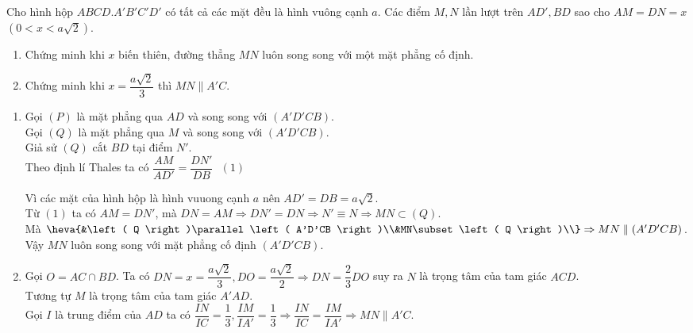 \begin{bt}%
	Cho hình hộp $ABCD.A'B'C'D'$ có tất cả các mặt đều là hình vuông cạnh $a$. Các điểm $M,N$ lần lượt trên $AD',BD$ sao cho $AM=DN=x$ $\left( 0<x<a\sqrt{2} \right)$.
	\begin{enumerate}
		\item Chứng minh khi $x$ biến thiên, đường thẳng $MN$ luôn song song với một mặt phẳng cố định.
		\item Chứng minh khi $x=\dfrac{a\sqrt{2}}{3}$ thì $MN\parallel A'C$.
	\end{enumerate}
	\loigiai
	{ 
		\begin{enumerate}
			\item \immini
			{
				Gọi $\left( P \right)$ là mặt phẳng qua $AD$ và song song với $\left( A'D'CB \right)$.\\
				Gọi $\left( Q \right)$ là mặt phẳng qua $M$ và song song với $\left( A'D'CB \right)$.\\
				Giả sử $\left( Q \right)$ cắt $BD$ tại điểm $N'$.\\
			Theo định lí Thales ta có
			$\dfrac{AM}{AD'}=\dfrac{DN'}{DB}\text{  }\left( 1 \right)$
			}
			{
			}
			Vì các mặt của hình hộp là hình vuuong cạnh $a$ nên $AD'=DB=a\sqrt{2}$.\\
			Từ $\left( 1 \right)$ ta có $AM=DN'$, mà $DN=AM\Rightarrow DN'=DN\Rightarrow N'\equiv N\Rightarrow MN\subset \left( Q \right)$.\\
			Mà $\heva{&\left( Q \right)\parallel \left( A'D'CB \right)\\&MN\subset \left( Q \right)\\}\Rightarrow MN\parallel \left( A'D'CB \right)$.\\
			Vậy $MN$ luôn song song với mặt phẳng cố định $\left( A'D'CB \right)$.
			
			\item Gọi $O=AC\cap BD$. Ta có
			$DN=x=\dfrac{a\sqrt{2}}{3},DO=\dfrac{a\sqrt{2}}{2}\Rightarrow DN=\dfrac{2}{3}DO$ suy ra $N$ là trọng tâm của tam giác $ACD$.\\
			Tương tự $M$ là trọng tâm của tam giác $A'AD$.\\
			Gọi $I$ là trung điểm của $AD$ ta có $\dfrac{IN}{IC}=\dfrac{1}{3},\dfrac{IM}{IA'}=\dfrac{1}{3}\Rightarrow \dfrac{IN}{IC}=\dfrac{IM}{IA'}\Rightarrow MN\parallel A'C$.			
		\end{enumerate}
	}
\end{bt}
